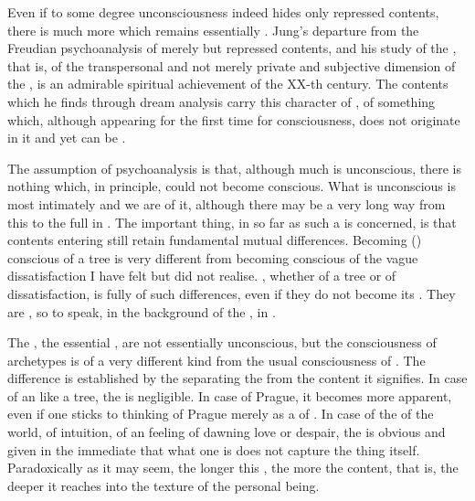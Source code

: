 Even if to some degree unconsciousness indeed hides only repressed
 contents, there is much more which remains essentially
. Jung's departure from the Freudian psychoanalysis of merely
 but 
repressed contents, and his study of the , that is,
of the transpersonal and not merely private and subjective dimension of the
, is an admirable spiritual achievement of the
XX-th century.  The  contents which he finds through dream
analysis carry this character of , of something which, although
appearing for the first time for consciousness, does not originate in it and yet
can be .  

The assumption of psychoanalysis is that, although much is unconscious, there is
nothing which, in principle, could not become conscious.  What is unconscious is
most intimately  and we are  of it, although there may be
a very long way from this  to the full  in
. The important thing, in so far as such a 
is concerned, is that contents entering  still retain fundamental
mutual differences. Becoming () conscious of a tree  is very different from becoming conscious of the vague
dissatisfaction I have felt but did not realise. , whether of a
tree or of dissatisfaction, is fully  of such differences, even if
they do not become its . They are , so to speak, in
the background of the , in .

The , the essential , are not essentially
unconscious, but the consciousness of archetypes is of a very different kind
from the usual consciousness of .  The difference is
established by the  separating the  from the
content it signifies.  In case of an  like a tree, the
 is negligible.  In case of Prague, it becomes more apparent, even
if one sticks to thinking of Prague merely as a  of .  In case of the  of the world, of  intuition, of
an  feeling of dawning love or despair, the  is
obvious and given in the immediate  that what one is  does not capture the thing itself.  Paradoxically as it may
seem, the longer this , the more  the content, that
is, the deeper it reaches into the texture of the personal being.

